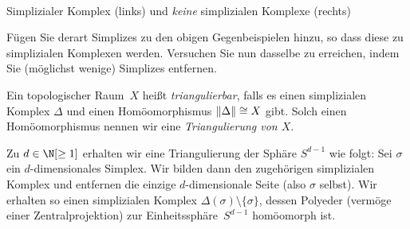\begin{center}
    \\
    \footnotesize
    Simplizialer Komplex (links) und 
    \emph{keine} simplizialen Komplexe (rechts)
\end{center}

\begin{thAufgabe}
    Fügen Sie derart Simplizes zu den obigen Gegenbeispielen hinzu, so dass
    diese zu simplizialen Komplexen werden. Versuchen Sie nun dasselbe zu
    erreichen, indem Sie (möglichst wenige) Simplizes entfernen.
\end{thAufgabe}

\begin{thDef}
    Ein topologischer Raum~$X$ heißt \emph{triangulierbar}, falls es
    einen simplizialen Komplex $\Delta$ und einen Homöomorphismus
    $\lVert\Delta\rVert \cong X$ gibt. Solch einen Homöomorphismus nennen wir 
    eine \emph{Triangulierung von $X$}.
\end{thDef}

\begin{thBeispiel}\label{gsc:bsp:spheretriang}
    Zu $d\in\N[\geq1]$ erhalten wir eine Triangulierung der Sphäre
    $S^{d-1}$ wie folgt: Sei $\sigma$ ein $d$-dimensionales Simplex. Wir bilden
    dann den zugehörigen simplizialen Komplex und entfernen die einzige
    $d$-dimensionale Seite (also $\sigma$ selbst). Wir erhalten so einen
    simplizialen Komplex $\Delta(\sigma)\setminus\{\sigma\}$, dessen Polyeder
    (vermöge einer Zentralprojektion) zur Einheitssphäre~$S^{d-1}$ homöomorph ist. 
\end{thBeispiel}

\enlargethispage{1.5cm}
\begin{center}
\end{center}
